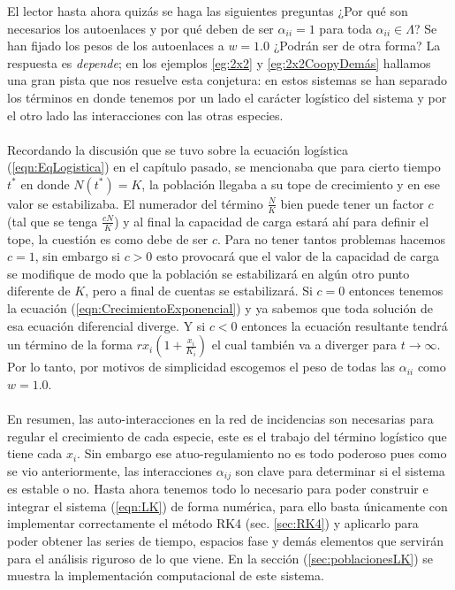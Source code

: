 \setlength{\parindent}{0cm} El lector hasta ahora quizás se haga las siguientes preguntas ¿Por qué son necesarios los autoenlaces y por qué deben de ser $\alpha_{ii}=1$ para toda $\alpha_{ii}\in\Lambda$? Se han fijado los pesos de los autoenlaces a $w=1.0$ ¿Podrán ser de otra forma? La respuesta es \textit{depende}; en los ejemplos \ref{eg:2x2} y \ref{eg:2x2CoopyDemás} hallamos una gran pista que nos resuelve esta conjetura: en estos sistemas se han separado los términos en donde tenemos por un lado el carácter logístico del sistema y por el otro lado las interacciones con las otras especies. \\
\\
Recordando la discusión que se tuvo sobre la ecuación logística (\ref{eqn:EqLogistica}) en el capítulo pasado, se mencionaba que para cierto tiempo $t^*$ en donde $N(t^*)=K$, la población llegaba a su tope de crecimiento y en ese valor se estabilizaba. El numerador del término $\frac{N}{K}$ bien puede tener un factor $c$ (tal que se tenga $\frac{cN}{K} $) y al final la capacidad de carga estará ahí para definir el tope, la cuestión es como debe  de ser $c$. Para no tener tantos problemas hacemos $c=1$, sin embargo si $c>0$ esto provocará que el valor de la capacidad de carga se modifique de modo que la población se estabilizará en algún otro punto diferente de $K$, pero a final de cuentas se estabilizará. Si $c=0$ entonces tenemos la ecuación (\ref{eqn:CrecimientoExponencial}) y ya sabemos que toda solución de esa ecuación diferencial diverge. Y si $c<0$ entonces la ecuación resultante tendrá un término de la forma $rx_i\left (1+\frac{x_i}{K_i}\right )$ el cual también va a diverger para $t\to\infty$. Por lo tanto, por motivos de simplicidad escogemos el peso de todas las $\alpha_{ii}$ como $w=1.0$. \\
\\
En resumen, las auto-interacciones en la red de incidencias son necesarias para regular el crecimiento de cada especie, este es el trabajo del término logístico que tiene cada $x_i$. Sin embargo ese atuo-regulamiento no es todo poderoso pues como se vio anteriormente, las interacciones $\alpha_{ij}$ son clave para determinar si el sistema es estable o no. Hasta ahora tenemos todo lo necesario para poder construir e integrar el sistema (\ref{eqn:LK}) de forma numérica, para ello basta únicamente con implementar correctamente el método RK4 (sec. \ref{sec:RK4}) y aplicarlo para poder obtener las series de tiempo, espacios fase y demás elementos que servirán para el análisis riguroso de lo que viene. En la sección (\ref{sec:poblacionesLK}) se muestra la implementación computacional de este sistema.

